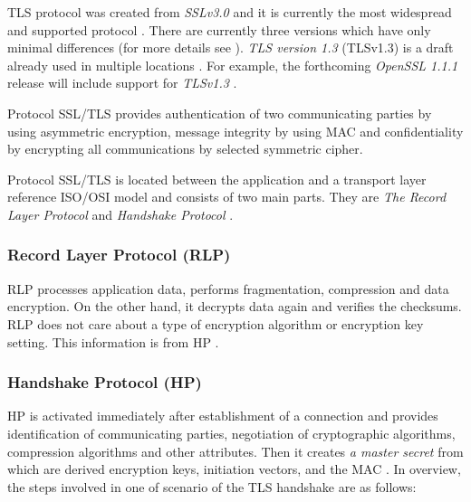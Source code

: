 \documentclass[
  oneside, 12pt, 
  printed, %
  notable,   %
  nolof,     %
  nolot,     %
]{fithesis3}
\begin{document}
TLS protocol was created from \textit{SSLv3.0} and it is currently the most widespread and 
supported protocol \cite{oppliger2003security}. There are currently three versions which have only 
minimal differences (for more details see \cite{differences}). \textit{TLS version 1.3} (TLSv1.3) 
is a draft already used in multiple locations \cite{draft-tls}. For example, the forthcoming \textit{OpenSSL 1.1.1} release will include support for \textit{TLSv1.3} \cite{foundation2}.

Protocol SSL/TLS provides authentication of two communicating parties by using asymmetric 
encryption, message integrity by using MAC and confidentiality by encrypting all communications 
by selected symmetric cipher.

Protocol SSL/TLS is located between the application and a transport layer reference ISO/OSI model 
and consists of two main parts. They are \textit{The Record Layer Protocol} and \textit{Handshake Protocol} \cite{oppliger2003security}. %

\subsubsection{Record Layer Protocol (RLP)}

RLP processes application data, performs fragmentation, compression and data encryption. On the 
other hand, it decrypts data again and verifies the checksums. RLP does not care about a type of 
encryption algorithm or encryption key setting. This information is from HP \cite{oppliger2003security}.

\subsubsection{Handshake Protocol (HP)}
HP is activated immediately after establishment of a connection and provides identification of 
communicating parties, negotiation of cryptographic algorithms, compression algorithms and other 
attributes. Then it creates \textit{a master secret} from which are derived encryption keys, 
initiation vectors, and the MAC \cite{oppliger2003security}. In overview, the steps involved in one of scenario of the TLS handshake are as follows:
\end{document}
